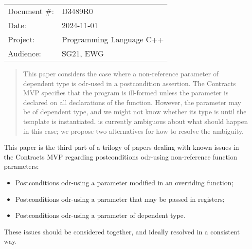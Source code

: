 \begin{tabular}{ll}
Document \#: & D3489R0 \\
Date: &2024-11-01 \\
Project: & Programming Language C++ \\
Audience: & SG21, EWG
\end{tabular}

\begin{abstract}
This paper considers the case where a non-reference parameter of dependent type is odr-used in a postcondition assertion. The Contracts MVP \cite{P2900R10} specifies that the program is ill-formed unless the parameter is declared  on all declarations of the function. However, the parameter may be of dependent type, and we might not know whether its type is  until the template is instantiated. \cite{P2900R10} is currently ambiguous about what should happen in this case; we propose two alternatives for how to resolve the ambiguity.
\end{abstract}







This paper is the third part of a trilogy of papers dealing with known issues in the Contracts MVP \cite{P2900R10} regarding postconditions odr-using non-reference function parameters:
\begin{itemize}
\item \cite{D3484R1} Postconditions odr-using a parameter modified in an overriding function;
\item \cite{D3487R0} Postconditions odr-using a parameter that may be passed in registers;
\item \cite{D3489R0} Postconditions odr-using a parameter of dependent type.
\end{itemize}
These issues should be considered together, and ideally resolved in a consistent way.

